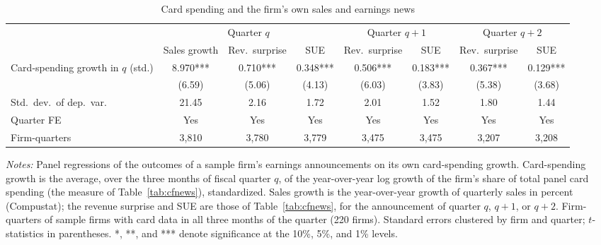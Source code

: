 \begin{table}[!htbp]\centering
\caption{Card spending and the firm's own sales and earnings news}\label{tab:cardpower}
\scriptsize
\begin{tabular*}{\linewidth}{@{\extracolsep{\fill}}lccccccc}
\toprule
 & \multicolumn{3}{c}{Quarter $q$} & \multicolumn{2}{c}{Quarter $q+1$} & \multicolumn{2}{c}{Quarter $q+2$} \\
\cmidrule(lr){2-4}\cmidrule(lr){5-6}\cmidrule(lr){7-8}
 & Sales growth & Rev.\ surprise & SUE & Rev.\ surprise & SUE & Rev.\ surprise & SUE \\
\midrule
Card-spending growth in $q$ (std.) & 8.970*** & 0.710*** & 0.348*** & 0.506*** & 0.183*** & 0.367*** & 0.129*** \\
 & (6.59) & (5.06) & (4.13) & (6.03) & (3.83) & (5.38) & (3.68) \\
\addlinespace
Std.\ dev.\ of dep.\ var. & 21.45 & 2.16 & 1.72 & 2.01 & 1.52 & 1.80 & 1.44 \\
Quarter FE & Yes & Yes & Yes & Yes & Yes & Yes & Yes \\
Firm-quarters & 3,810 & 3,780 & 3,779 & 3,475 & 3,475 & 3,207 & 3,208 \\
\bottomrule
\end{tabular*}
\par\vspace{4pt}\begin{minipage}{\linewidth}\scriptsize \emph{Notes:} Panel regressions of the outcomes of a sample firm's earnings announcements on its own card-spending growth. Card-spending growth is the average, over the three months of fiscal quarter $q$, of the year-over-year log growth of the firm's share of total panel card spending (the measure of Table~\ref{tab:cfnews}), standardized. Sales growth is the year-over-year growth of quarterly sales in percent (Compustat); the revenue surprise and SUE are those of Table~\ref{tab:cfnews}, for the announcement of quarter $q$, $q+1$, or $q+2$. Firm-quarters of sample firms with card data in all three months of the quarter (220 firms). Standard errors clustered by firm and quarter; $t$-statistics in parentheses. *, **, and *** denote significance at the 10\%, 5\%, and 1\% levels.\end{minipage}
\end{table}